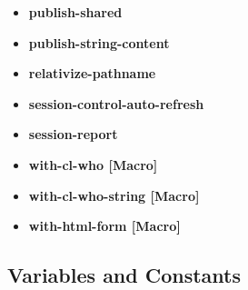 \documentclass [11pt]{book}
\begin{document}
\begin{itemize}
\item {}
\label{prim:publish-shared}
\textbf{publish-shared}





\item {}
\label{prim:publish-string-content}
\textbf{publish-string-content}





\item {}
\label{prim:relativize-pathname}
\textbf{relativize-pathname}





\item {}
\label{prim:session-control-auto-refresh}
\textbf{session-control-auto-refresh}





\item {}
\label{prim:session-report}
\textbf{session-report}





\item {}
\label{prim:with-cl-who}
\textbf{with-cl-who [Macro]}





\item {}
\label{prim:with-cl-who-string}
\textbf{with-cl-who-string [Macro]}





\item {}
\label{prim:with-html-form}
\textbf{with-html-form [Macro]}





\end{itemize}



\subsection{Variables and Constants}

\label{subsec:variablesandconstants}
\end{document}
